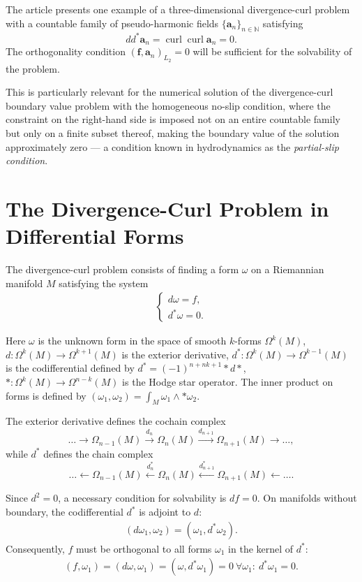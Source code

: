 \documentclass[a4paper]{article}
\newcommand{\N}{\mathbb{N}}
\newcommand{\bff}{\mathbf{f}}
\newcommand{\ba}{\mathbf{a}}
\newcommand{\curl}{\operatorname{curl}}
\begin{document}
The article presents one example of a three-dimensional divergence-curl problem with a countable family of pseudo-harmonic fields $\{\ba_n\}_{n\in \N}$ satisfying
$$
d d^* \ba_n = \curl \curl \ba_n =0.
$$
The orthogonality condition $(\bff,\ba_n)_{L_2}=0$ will be sufficient for the solvability of the problem.

This is particularly relevant for the numerical solution of the divergence-curl boundary value problem with the homogeneous no-slip condition, where the constraint on the right-hand side is imposed not on an entire countable family but only on a finite subset thereof, making the boundary value of the solution approximately zero --- a condition known in hydrodynamics as the {\it partial-slip condition}.

\section{The Divergence-Curl Problem in Differential Forms}

The divergence-curl problem consists of finding a form $\omega$ on a Riemannian manifold $M$ satisfying the system
\begin{align} \label{divcurl}
\begin{cases}
d\omega = f,\\
d^*\omega = 0.
\end{cases}
\end{align}

Here $\omega$ is the unknown form in the space of smooth $k$-forms $\Omega^k(M)$, $d:\Omega^k(M) \to \Omega^{k+1}(M)$ is the exterior derivative, $d^*:\Omega^k(M) \to \Omega^{k-1}(M)$ is the codifferential defined by $d^*=(-1)^{n+nk+1} *d*$, $*:\Omega^k(M) \to \Omega^{n-k}(M)$ is the Hodge star operator.
The inner product on forms is defined by
$(\omega_1, \omega_2) = \int_M \omega_1 \wedge *\omega_2$.

The exterior derivative defines the cochain complex
$$
{\displaystyle \ldots \xrightarrow {} \Omega_{n-1}(M)\xrightarrow {d_{n}} \Omega_{n}(M)\xrightarrow {d _{n+1}} \Omega_{n+1}(M)\xrightarrow {} \ldots },
$$
while $d^*$ defines the chain complex
$$
{\displaystyle \ldots \xleftarrow {} \Omega_{n-1}(M)\xleftarrow {d^*_{n}} \Omega_{n}(M)\xleftarrow {d ^*_{n+1}} \Omega_{n+1}(M)\xleftarrow {} \ldots }.
$$

Since $d^2=0$, a necessary condition for solvability is $df=0$. On manifolds without boundary, the codifferential $d^*$ is adjoint to $d$:
\begin{align}\label{scalprod}
(d\omega_1, \omega_2) = (\omega_1, d^*\omega_2).
\end{align}
Consequently, $f$ must be orthogonal to all forms $\omega_1$ in the kernel of $d^*$:
\begin{align}\label{ort1}
(f,\omega_1) = (d\omega, \omega_1) = (\omega, d^*\omega_1) = 0~\forall \omega_1:~d^*\omega_1=0.
\end{align}
\end{document}
